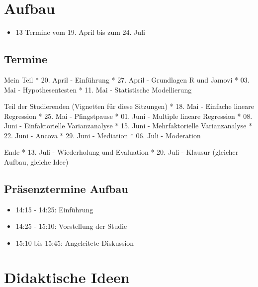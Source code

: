 \documentclass[
]{book}
\providecommand{\tightlist}{%
  \setlength{\itemsep}{0pt}\setlength{\parskip}{0pt}}
\begin{document}
\hypertarget{aufbau}{%
\section{Aufbau}\label{aufbau}}

\begin{itemize}
\tightlist
\item
  13 Termine vom 19. April bis zum 24. Juli
\end{itemize}

\hypertarget{termine}{%
\subsection{Termine}\label{termine}}

Mein Teil
* 20. April - Einführung
* 27. April - Grundlagen R und Jamovi
* 03. Mai - Hypothesentesten
* 11. Mai - Statistische Modellierung

Teil der Studierenden (Vignetten für diese Sitzungen)
* 18. Mai - Einfache lineare Regression
* 25. Mai - Pfingstpause
* 01. Juni - Multiple lineare Regression
* 08. Juni - Einfaktorielle Varianzanalyse
* 15. Juni - Mehrfaktorielle Varianzanalyse
* 22. Juni - Ancova
* 29. Juni - Mediation
* 06. Juli - Moderation

Ende
* 13. Juli - Wiederholung und Evaluation
* 20. Juli - Klausur (gleicher Aufbau, gleiche Idee)

\hypertarget{pruxe4senztermine-aufbau}{%
\subsection{Präsenztermine Aufbau}\label{pruxe4senztermine-aufbau}}

\begin{itemize}
\tightlist
\item
  14:15 - 14:25: Einführung
\item
  14:25 - 15:10: Vorstellung der Studie
\item
  15:10 bis 15:45: Angeleitete Diskussion
\end{itemize}

\hypertarget{didaktische-ideen}{%
\section{Didaktische Ideen}\label{didaktische-ideen}}
\end{document}

